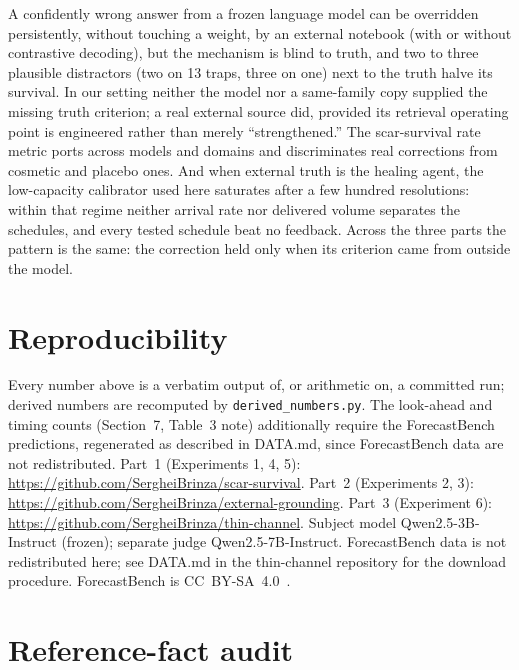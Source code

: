 \documentclass[11pt]{article}
\newcommand{\scar}{scar\nobreakdash-survival rate}
\begin{document}
A confidently wrong answer from a frozen language model can be overridden
persistently, without touching a weight, by an external notebook (with or without contrastive
decoding), but the
mechanism is blind to truth, and two to three plausible distractors (two on 13
traps, three on one) next to the truth halve its survival. In our setting neither the model nor a same-family copy supplied
the missing truth criterion; a real external source did, provided its retrieval operating
point is engineered rather than merely ``strengthened.'' The \scar{} metric ports
across models and domains and discriminates real corrections from cosmetic and
placebo ones. And when external truth is the healing agent, the low-capacity
calibrator used here saturates after a few hundred resolutions: within that
regime neither arrival rate nor delivered volume separates the schedules, and
every tested schedule beat no feedback. Across the three parts the pattern is the same: the
correction held only when its criterion came from outside the model.

\section*{Reproducibility}
Every number above is a verbatim output of, or arithmetic on, a committed run;
derived numbers are recomputed by \texttt{derived\_numbers.py}.
The look-ahead and timing counts (Section~7, Table~3 note) additionally require
the ForecastBench predictions, regenerated as described in DATA.md, since
ForecastBench data are not redistributed.
Part~1 (Experiments 1, 4, 5): \url{https://github.com/SergheiBrinza/scar-survival}.
Part~2 (Experiments 2, 3): \url{https://github.com/SergheiBrinza/external-grounding}.
Part~3 (Experiment 6): \url{https://github.com/SergheiBrinza/thin-channel}.
Subject model Qwen2.5-3B-Instruct (frozen); separate judge Qwen2.5-7B-Instruct.
ForecastBench data is not redistributed here; see DATA.md in the thin-channel
repository for the download procedure. ForecastBench is
CC~BY-SA~4.0~\cite{forecastbench}.




\clearpage
\appendix
\section{Reference-fact audit}
\label{app:audit}
\end{document}
